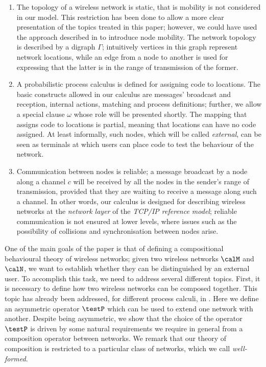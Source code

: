 \documentclass{LMCS}
\begin{document}
\begin{enumerate}[label=(\roman*)]
\item The topology of a wireless network is static, that is mobility is not 
considered in our model. 
This restriction has been done to allow a more clear presentation of the 
topics treated in this paper; however, 
we could have used the approach described in \cite{francalanza2008} to 
introduce node mobility.
The network topology is 
described by a digraph $\Gamma$; 
intuitively vertices in this graph represent network locations, while 
an edge from a node to another is used for expressing that the latter is 
in the range of transmission of the former. 

\item A probabilistic process calculus is defined for assigning code to locations. 
The basic constructs allowed in our calculus are messages' broadcast and reception, 
internal actions, matching and process definitions; further, we allow a special clause 
$\omega$ whose role will be presented shortly.  
The mapping that assigns code to locations is partial, meaning that locations can have no code 
assigned. At least informally, such nodes, which will be called \emph{external}, 
can be seen as terminals at which users can place code 
to test the behaviour of the network.

\item Communication between nodes is reliable; a message broadcast by a 
node along a channel $c$ will be received by all the nodes in the sender's 
range of transmission, provided that they are waiting to receive a message 
along such a channel. In other words, our calculus is designed for describing 
wireless networks at the \emph{network layer} of the \emph{TCP/IP reference model}; 
reliable communication is not ensured at lower levels, where 
issues such as the possibility of collisions \cite{macsurvey} and synchronisation between 
nodes \cite{time} arise.
\end{enumerate}

\noindent One of the main goals of the paper is that of defining a compositional behavioural 
theory of wireless networks; given two wireless networks $\calM$ and 
$\calN$, we want to establish whether they can be distinguished by 
an external user. 
To accomplish this task, we need to address several different topics. 
First, it is necessary to define how two wireless networks can be composed 
together. 
This topic has already 
been addressed, for different process calculi, in \cite{merro,gallina2011,CHM12,bugliesi2012,songphd}.
Here we define an asymmetric operator 
$\testP$ which can be used to extend one network with another. 
Despite being asymmetric, we show that the choice of the operator $\testP$ is 
driven by  some natural requirements we require in general 
from a composition operator between networks. 
We remark that our theory 
of composition is restricted to a particular class of networks, 
which we call \emph{well-formed}.
\end{document}
